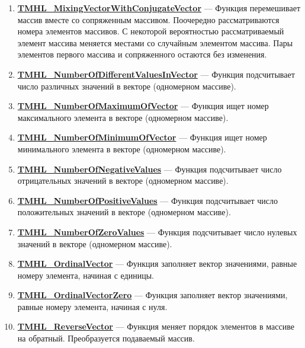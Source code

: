 \documentclass[a4paper,12pt]{article}
\begin{document}
\begin{enumerate}
\item \textbf{\hyperref[TMHL_MixingVectorWithConjugateVector]{TMHL\_MixingVectorWithConjugateVector}} --- Функция перемешивает массив вместе со сопряженным массивом. Поочередно рассматриваются номера элементов массивов. С некоторой вероятностью рассматриваемый элемент массива меняется местами со случайным элементом массива. Пары элементов первого массива и сопряженного остаются без изменения.

\item \textbf{\hyperref[TMHL_NumberOfDifferentValuesInVector]{TMHL\_NumberOfDifferentValuesInVector}} --- Функция подсчитывает число различных значений в векторе (одномерном массиве).

\item \textbf{\hyperref[TMHL_NumberOfMaximumOfVector]{TMHL\_NumberOfMaximumOfVector}} --- Функция ищет номер максимального элемента в векторе (одномерном массиве).

\item \textbf{\hyperref[TMHL_NumberOfMinimumOfVector]{TMHL\_NumberOfMinimumOfVector}} --- Функция ищет номер минимального элемента в векторе (одномерном массиве).

\item \textbf{\hyperref[TMHL_NumberOfNegativeValues]{TMHL\_NumberOfNegativeValues}} --- Функция подсчитывает число отрицательных значений в векторе (одномерном массиве).

\item \textbf{\hyperref[TMHL_NumberOfPositiveValues]{TMHL\_NumberOfPositiveValues}} --- Функция подсчитывает число положительных значений в векторе (одномерном массиве).

\item \textbf{\hyperref[TMHL_NumberOfZeroValues]{TMHL\_NumberOfZeroValues}} --- Функция подсчитывает число нулевых значений в векторе (одномерном массиве).

\item \textbf{\hyperref[TMHL_OrdinalVector]{TMHL\_OrdinalVector}} --- Функция заполняет вектор значениями, равные номеру элемента, начиная с единицы.

\item \textbf{\hyperref[TMHL_OrdinalVectorZero]{TMHL\_OrdinalVectorZero}} --- Функция заполняет вектор значениями, равные номеру элемента, начиная с нуля.

\item \textbf{\hyperref[TMHL_ReverseVector]{TMHL\_ReverseVector}} --- Функция меняет порядок элементов в массиве на обратный. Преобразуется подаваемый массив.


\end{enumerate}
\end{document}
